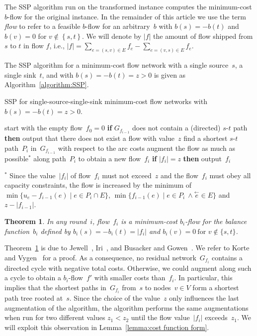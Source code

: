 \documentclass[11pt]{article}
\newtheorem{theorem}{Theorem}
\newcommand{\SET}[1]{\left\{#1\right\}}
\begin{document}
The SSP algorithm run on the transformed instance computes the minimum-cost $b$-flow for the original instance.
In the remainder of this article we use the term \emph{flow} to refer to a feasible $b$-flow for an arbitrary~$b$ with $b(s) = -b(t)$ and $b(v) = 0$ for $v \notin \SET{ s, t }$.
We will denote by $|f|$ the amount of flow shipped from $s$ to $t$ in flow $f$,
i.e.,
$|f| = \sum_{e = (s, v) \in E} f_e - \sum_{e = (v, s) \in E} f_e$.

The SSP algorithm for a minimum-cost flow network with a single source~$s$, a single sink~$t$, and with $b(s) = -b(t) = z > 0$ is given as Algorithm~\ref{algorithm:SSP}.

\begin{algorithm*}
  \caption{SSP for single-source-single-sink minimum-cost flow networks with $b(s) = -b(t) = z > 0$.}
  \label{algorithm:SSP}
  \begin{algorithmic}[1]
    \STATE start with the empty flow~$f_0 = 0$
      \STATE \textbf{if} $G_{f_{i-1}}$ does not contain a (directed) $s$-$t$ path \textbf{then} output that there does not exist a flow with value~$z$
      \STATE find a shortest $s$-$t$ path~$P_i$ in~$G_{f_{i-1}}$ with respect to the arc costs
      \STATE augment the flow as much as possible$^*$ along path~$P_i$ to obtain a new flow~$f_i$
      \STATE \textbf{if} $|f_i| = z$ \textbf{then} output~$f_i$
    \ENDFOR
  \end{algorithmic}
  \medskip

  \small $^*$ Since the value~$|f_i|$ of flow~$f_i$ must not exceed~$z$ and the flow~$f_i$ must obey all capacity constraints, the flow is increased by the minimum of $\min\{u_e - f_{i-1}(e) \mid e \in P_i \cap E\}$, $\min\{f_{i-1}(e) \mid e \in P_i~\wedge\stackrel{\leftarrow}{e} \in E\}$ and $z - |f_{i-1}|$.
\end{algorithm*}

\begin{theorem}
\label{thm:AllFlowsOpt}
In any round~$i$, flow~$f_i$ is a minimum-cost $b_i$-flow for the balance function~$b_i$ defined by
$
  b_i(s) = -b_i(t) = |f_i|
$
and
$
  b_i(v) = 0 \ \text{for~$v\notin\{s,t\}$}
$.
\end{theorem}

Theorem~\ref{thm:AllFlowsOpt} is due to Jewell~\cite{Jew62}, Iri~\cite{Iri60}, and Busacker and Gowen~\cite{BusGow60}. We refer to Korte and Vygen~\cite{Korte:2007:COT:1564997} for a proof.
As a consequence, no residual network~$G_{f_i}$ contains a directed cycle with negative total costs. Otherwise, we could augment along such a cycle to obtain a $b_i$-flow~$f'$ with smaller costs than~$f_i$. In particular, this implies that the shortest paths in~$G_{f_i}$ from~$s$ to nodes~$v \in V$ form a shortest path tree rooted at~$s$. Since the choice of the value~$z$ only influences the last augmentation of the algorithm, the algorithm performs the same augmentations when run for two different values $z_1 < z_2$ until the flow value~$|f_i|$ exceeds~$z_1$. We will exploit this observation in Lemma~\ref{lemma:cost function form}. 
\end{document}
